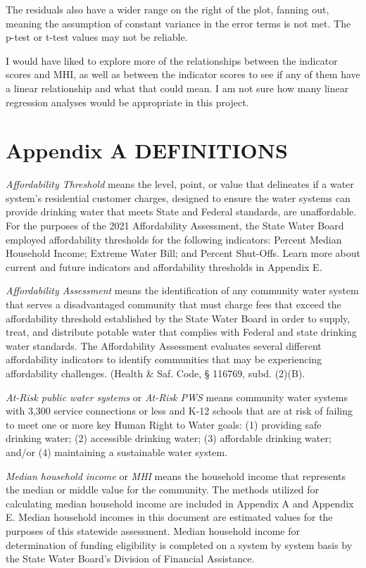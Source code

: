 \documentclass[
  letterpaper,
  DIV=11,
  numbers=noendperiod]{scrartcl}
\begin{document}
The residuals also have a wider range on the right of the plot, fanning
out, meaning the assumption of constant variance in the error terms is
not met. The p-test or t-test values may not be reliable.

I would have liked to explore more of the relationships between the
indicator scores and MHI, as well as between the indicator scores to see
if any of them have a linear relationship and what that could mean. I am
not sure how many linear regression analyses would be appropriate in
this project.

\section{Appendix A DEFINITIONS}\label{sec-definitions}

\emph{Affordability Threshold} means the level, point, or value that
delineates if a water system's residential customer charges, designed to
ensure the water systems can provide drinking water that meets State and
Federal standards, are unaffordable. For the purposes of the 2021
Affordability Assessment, the State Water Board employed affordability
thresholds for the following indicators: Percent Median Household
Income; Extreme Water Bill; and Percent Shut-Offs. Learn more about
current and future indicators and affordability thresholds in Appendix
E.

\emph{Affordability Assessment} means the identification of any
community water system that serves a disadvantaged community that must
charge fees that exceed the affordability threshold established by the
State Water Board in order to supply, treat, and distribute potable
water that complies with Federal and state drinking water standards. The
Affordability Assessment evaluates several different affordability
indicators to identify communities that may be experiencing
affordability challenges. (Health \& Saf. Code, § 116769, subd. (2)(B).

\emph{At-Risk public water systems} or \emph{At-Risk PWS} means
community water systems with 3,300 service connections or less and K-12
schools that are at risk of failing to meet one or more key Human Right
to Water goals: (1) providing safe drinking water; (2) accessible
drinking water; (3) affordable drinking water; and/or (4) maintaining a
sustainable water system.

\emph{Median household income} or \emph{MHI} means the household income
that represents the median or middle value for the community. The
methods utilized for calculating median household income are included in
Appendix A and Appendix E. Median household incomes in this document are
estimated values for the purposes of this statewide assessment. Median
household income for determination of funding eligibility is completed
on a system by system basis by the State Water Board's Division of
Financial Assistance.
\end{document}
